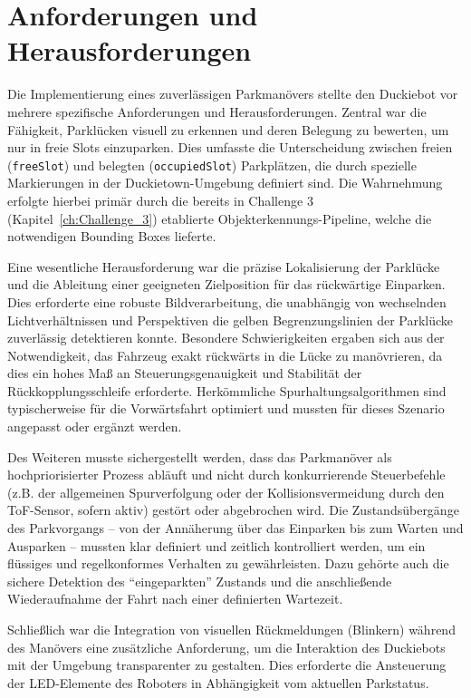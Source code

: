 \section{Anforderungen und Herausforderungen}
Die Implementierung eines zuverlässigen Parkmanövers stellte den Duckiebot vor mehrere spezifische Anforderungen und Herausforderungen. Zentral war die Fähigkeit, Parklücken visuell zu erkennen und deren Belegung zu bewerten, um nur in freie Slots einzuparken. Dies umfasste die Unterscheidung zwischen freien (\texttt{freeSlot}) und belegten (\texttt{occupiedSlot}) Parkplätzen, die durch spezielle Markierungen in der Duckietown-Umgebung definiert sind. Die Wahrnehmung erfolgte hierbei primär durch die bereits in Challenge 3 (Kapitel~\ref{ch:Challenge_3}) etablierte Objekterkennungs-Pipeline, welche die notwendigen Bounding Boxes lieferte.

Eine wesentliche Herausforderung war die präzise Lokalisierung der Parklücke und die Ableitung einer geeigneten Zielposition für das rückwärtige Einparken. Dies erforderte eine robuste Bildverarbeitung, die unabhängig von wechselnden Lichtverhältnissen und Perspektiven die gelben Begrenzungslinien der Parklücke zuverlässig detektieren konnte. Besondere Schwierigkeiten ergaben sich aus der Notwendigkeit, das Fahrzeug exakt rückwärts in die Lücke zu manövrieren, da dies ein hohes Maß an Steuerungsgenauigkeit und Stabilität der Rückkopplungsschleife erforderte. Herkömmliche Spurhaltungsalgorithmen sind typischerweise für die Vorwärtsfahrt optimiert und mussten für dieses Szenario angepasst oder ergänzt werden.

Des Weiteren musste sichergestellt werden, dass das Parkmanöver als hochpriorisierter Prozess abläuft und nicht durch konkurrierende Steuerbefehle (z.B. der allgemeinen Spurverfolgung oder der Kollisionsvermeidung durch den \ac{ToF}-Sensor, sofern aktiv) gestört oder abgebrochen wird. Die Zustandsübergänge des Parkvorgangs – von der Annäherung über das Einparken bis zum Warten und Ausparken – mussten klar definiert und zeitlich kontrolliert werden, um ein flüssiges und regelkonformes Verhalten zu gewährleisten. Dazu gehörte auch die sichere Detektion des \enquote{eingeparkten} Zustands und die anschließende Wiederaufnahme der Fahrt nach einer definierten Wartezeit.

\newpage

Schließlich war die Integration von visuellen Rückmeldungen (Blinkern) während des Manövers eine zusätzliche Anforderung, um die Interaktion des Duckiebots mit der Umgebung transparenter zu gestalten. Dies erforderte die Ansteuerung der LED-Elemente des Roboters in Abhängigkeit vom aktuellen Parkstatus.

